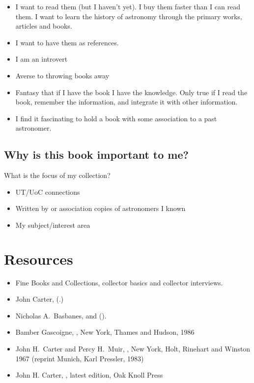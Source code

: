 \documentclass[letterpaper]{article}
\begin{document}
\begin{itemize}
\item I want to read them (but I haven't yet). I buy them faster than
  I can read them. I want to learn the history of astronomy through
  the primary works, articles and books.
\item I want to have them as references.
\item I am an introvert
\item Averse to throwing books away
\item Fantasy that if I have the book I have the knowledge. Only true
  if I read the book, remember the information, and integrate it with
  other information.
\item I find it fascinating to hold a book with some association
  to a past astronomer.
\end{itemize}


\subsection{Why is this book important to me?}

What is the focus of my collection?

\begin{itemize}
\item UT/UoC connections
\item Written by or association copies of astronomers I known
\item My subject/interest area
\end{itemize}

\section{Resources}

\begin{itemize}
\item Fine Books and Collections, collector basics and collector interviews.

\item John Carter,  (\cite{Carter1970}.)

\item Nicholas A.\ Basbanes,  \cite{Basbanes1999}
  and  (\cite{Basbanes2002}).

\item Bamber Gascoigne, , New York,
  Thames and Hudson, 1986

\item John H.\ Carter and Percy H.\ Muir, , New York, Holt, Rinehart and Winston 1967 (reprint Munich,
  Karl Pressler, 1983)

\item John H. Carter, , latest edition,
  Oak Knoll Press
\end{itemize}
\end{document}
